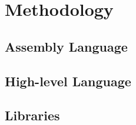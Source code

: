 \documentclass[crop=false]{standalone}
\begin{document}
  \section{Methodology} %
  \label{sec:methodology}
    \subsection{Assembly Language} %
    \label{sub:assembly_language}


    \subsection{High-level Language} %
    \label{sub:high_level_language}


    \subsection{Libraries} %
    \label{sub:libraries}

\end{document}
